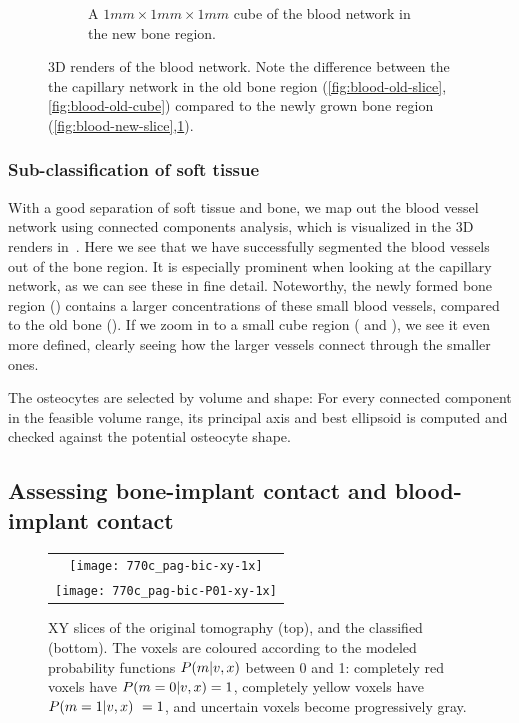 \begin{figure}
\begin{subfigure}[b]{.48\linewidth}
        \caption{A $1mm \times 1 mm \times 1 mm$ cube of the blood network in the new bone region.}
        \label{fig:blood-new-cube}
    \end{subfigure}
    \caption{3D renders of the blood network. Note the difference between the the capillary network in the old bone region (\ref{fig:blood-old-slice},\ref{fig:blood-old-cube}) compared to the newly grown bone region (\ref{fig:blood-new-slice},\ref{fig:blood-new-cube}).}
    \label{fig:blood-network}
\end{figure}

\subsubsection{Sub-classification of soft tissue}

With a good separation of soft tissue and bone, we map out the blood vessel network using connected
components analysis, which is visualized in the 3D renders in~.
Here we see that we have successfully segmented the blood vessels out of the bone region.
It is especially prominent when looking at the capillary network, as we can see these in fine detail.
Noteworthy, the newly formed bone region () contains a larger concentrations of these small blood vessels, compared to the old bone ().
If we zoom in to a small cube region ( and ), we see it even more defined, clearly seeing how the larger vessels connect through the smaller ones.

The osteocytes are selected by volume and shape: For every connected component
in the feasible volume range, its principal axis and best ellipsoid is computed and checked against
the potential osteocyte shape.

\subsection{Assessing bone-implant contact and blood-implant contact}

\begin{figure}
  \centering
  \begin{tabular}{c}
    \texttt{[image: 770c\_pag-bic-xy-1x]} \\
    \texttt{[image: 770c\_pag-bic-P01-xy-1x]}
  \end{tabular}
  \caption{XY slices of the original tomography (top), and the classified (bottom). The voxels are coloured according to the modeled probability functions $P(m\vert v,x)$ between 0 and 1: completely red voxels have $P(m=0\vert v,x) = 1$, completely yellow voxels have $P(m=1\vert v,x)\ = 1$, and uncertain voxels become progressively gray.
  }
  \label{fig:histology-comparison1}
\end{figure}

